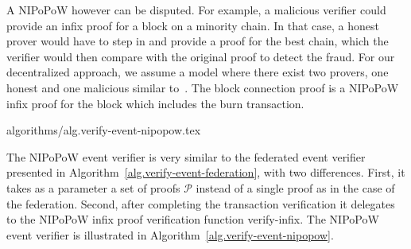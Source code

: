 A NIPoPoW however can be disputed. For example, a malicious verifier could provide an infix proof for a block on a minority chain. In that case, a honest prover would have to step in and provide a proof for the best chain, which the verifier would then compare with the original proof to detect the fraud. For our decentralized approach, we assume a model where there exist two provers, one honest and one malicious similar to~\cite{nipopows,flyclient}. The block connection proof is a NIPoPoW infix proof for the block which includes the burn transaction.

{algorithms/alg.verify-event-nipopow.tex}

The NIPoPoW event verifier is very similar to the federated event verifier presented in Algorithm~\ref{alg.verify-event-federation}, with two differences. First, it takes as a parameter a set of proofs $\mathcal{P}$ instead of a single proof as in the case of the federation. Second, after completing the transaction verification it delegates to the NIPoPoW infix proof verification function \textsf{verify-infix}. The NIPoPoW event verifier is illustrated in Algorithm~\ref{alg.verify-event-nipopow}.
